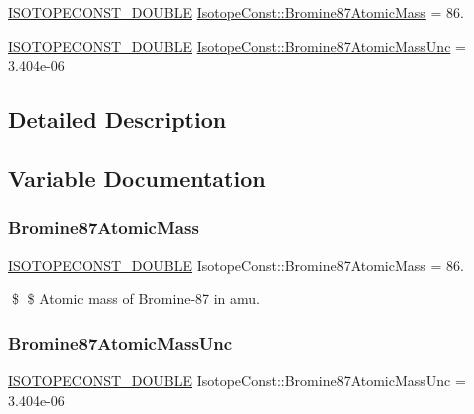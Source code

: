 \begin{DoxyCompactItemize}
\item 
\mbox{\hyperlink{group___isotope_const-_macros_ga8f45a7272ce02c0b4c65c44636ed719a}{I\+S\+O\+T\+O\+P\+E\+C\+O\+N\+S\+T\+\_\+\+D\+O\+U\+B\+LE}} \mbox{\hyperlink{group___isotope_const-_bromine-_br87_ga88a747d967d51f627677e2b80c1cb28d}{Isotope\+Const\+::\+Bromine87\+Atomic\+Mass}} = 86.
\item 
\mbox{\hyperlink{group___isotope_const-_macros_ga8f45a7272ce02c0b4c65c44636ed719a}{I\+S\+O\+T\+O\+P\+E\+C\+O\+N\+S\+T\+\_\+\+D\+O\+U\+B\+LE}} \mbox{\hyperlink{group___isotope_const-_bromine-_br87_ga603f72de804ea5eb91c4938c9e0897ea}{Isotope\+Const\+::\+Bromine87\+Atomic\+Mass\+Unc}} = 3.\+404e-\/06
\end{DoxyCompactItemize}


\subsection{Detailed Description}


\subsection{Variable Documentation}
\mbox{\label{group___isotope_const-_bromine-_br87_ga88a747d967d51f627677e2b80c1cb28d}} 
\subsubsection{\texorpdfstring{Bromine87\+Atomic\+Mass}{Bromine87AtomicMass}}
{\footnotesize\ttfamily \mbox{\hyperlink{group___isotope_const-_macros_ga8f45a7272ce02c0b4c65c44636ed719a}{I\+S\+O\+T\+O\+P\+E\+C\+O\+N\+S\+T\+\_\+\+D\+O\+U\+B\+LE}} Isotope\+Const\+::\+Bromine87\+Atomic\+Mass = 86.}

\$ \$ Atomic mass of Bromine-\/87 in amu. \mbox{\label{group___isotope_const-_bromine-_br87_ga603f72de804ea5eb91c4938c9e0897ea}} 
\subsubsection{\texorpdfstring{Bromine87\+Atomic\+Mass\+Unc}{Bromine87AtomicMassUnc}}
{\footnotesize\ttfamily \mbox{\hyperlink{group___isotope_const-_macros_ga8f45a7272ce02c0b4c65c44636ed719a}{I\+S\+O\+T\+O\+P\+E\+C\+O\+N\+S\+T\+\_\+\+D\+O\+U\+B\+LE}} Isotope\+Const\+::\+Bromine87\+Atomic\+Mass\+Unc = 3.\+404e-\/06}

